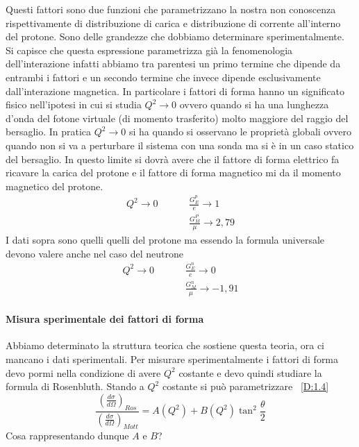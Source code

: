 Questi fattori sono due funzioni che parametrizzano la nostra non conoscenza rispettivamente di distribuzione di carica e distribuzione di corrente all'interno del protone.
Sono delle grandezze che dobbiamo determinare sperimentalmente.
Si capisce che questa espressione parametrizza già la fenomenologia dell'interazione infatti abbiamo tra parentesi un primo termine che dipende da entrambi i fattori e un secondo termine che invece dipende esclusivamente dall'interazione magnetica.
In particolare i fattori di forma hanno un significato fisico nell'ipotesi in cui si studia $Q^2\to 0$ ovvero quando si ha una lunghezza d'onda del fotone virtuale (di momento trasferito) molto maggiore del raggio del bersaglio.
In pratica $Q^2\to 0$ si ha quando si osservano le proprietà globali ovvero quando non si va a perturbare il sistema con una sonda ma si è in un caso statico del bersaglio.
In questo limite si dovrà avere che il fattore di forma elettrico fa ricavare la carica del protone e il fattore di forma magnetico mi da il momento magnetico del protone.
\begin{equation}
\begin{split}
Q^2\to 0\hspace{1cm}&\frac{G^p_E}{e}\to 1\\
&\frac{G^P_M}{\mu}\to 2,79
\end{split}
\end{equation}
I dati sopra sono quelli quelli del protone ma essendo la formula universale devono valere anche nel caso del neutrone
\begin{equation}
\begin{split}
Q^2\to 0\hspace{1cm}&\frac{G_E^n}{e}\to 0\\
&\frac{G_M^n}{\mu}\to -1,91
\end{split}
\end{equation}

\paragraph{Misura sperimentale dei fattori di forma}
Abbiamo determinato la struttura teorica che sostiene questa teoria, ora ci mancano i dati sperimentali.
Per misurare sperimentalmente i fattori di forma devo pormi nella condizione di avere $Q^2$ costante e devo quindi studiare la formula di Rosenbluth.
Stando a $Q^2$ costante si può parametrizzare ~\eqref{D:1.4}
\begin{equation}
\frac{\left(\frac{d\sigma}{d\Omega}\right)_{Ros}}{\left(\frac{d\sigma}{d\Omega}\right)_{Mott}}=A(Q^2)+B(Q^2)\tan^2\frac{\theta}{2}
\end{equation}
Cosa rappresentando dunque $A$ e $B$?

